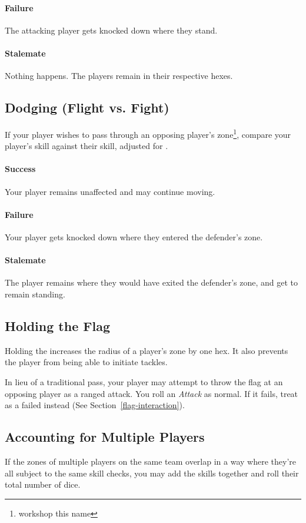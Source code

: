 \paragraph{Failure}
The attacking player gets knocked down where they stand.
\paragraph{Stalemate}
Nothing happens.
The players remain in their respective hexes.

\subsection{Dodging (Flight vs. Fight)}
If your player wishes to pass through an opposing player's zone\footnote{workshop this name}, compare your player's \flight{} skill against their \fight{} skill, adjusted for \fate{}.

\paragraph{Success}
Your player remains unaffected and may continue moving.
\paragraph{Failure}
Your player gets knocked down where they entered the defender's zone.
\paragraph{Stalemate}
The player remains where they would have exited the defender's zone, and get to remain standing.

\subsection{Holding the Flag}
Holding the \flag{} increases the radius of a player's zone by one hex.
It also prevents the player from being able to initiate tackles.

In lieu of a traditional pass, your player may attempt to throw the flag at an opposing player as a ranged attack.
You roll an \textit{Attack} as normal.
If it fails, treat as a failed \throw{} instead (See Section~\ref{flag-interaction}).

\subsection{Accounting for Multiple Players}
If the zones of multiple players on the same team overlap in a way where they're all subject to the same skill checks, you may add the skills together and roll their total number of \fate{} dice.

